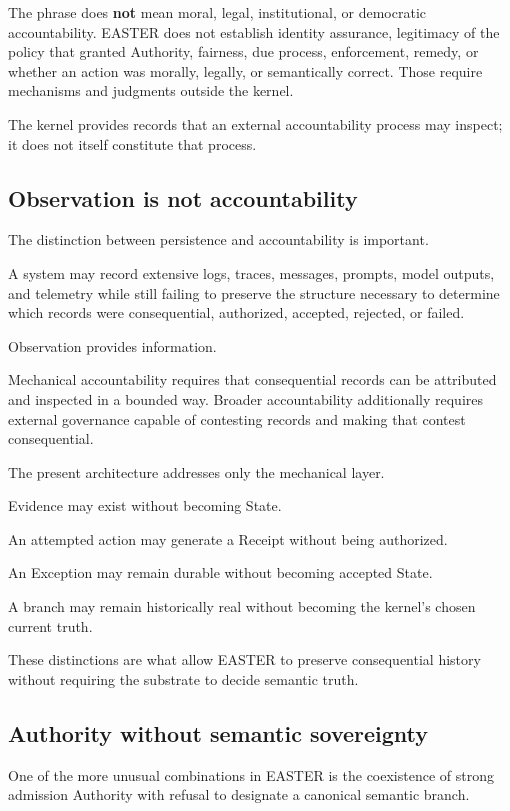 \documentclass[11pt]{article}
\begin{document}
The phrase does \textbf{not} mean moral, legal, institutional, or democratic accountability. EASTER does not establish identity assurance, legitimacy of the policy that granted Authority, fairness, due process, enforcement, remedy, or whether an action was morally, legally, or semantically correct. Those require mechanisms and judgments outside the kernel.

The kernel provides records that an external accountability process may inspect; it does not itself constitute that process.

\subsection{Observation is not accountability}

The distinction between persistence and accountability is important.

A system may record extensive logs, traces, messages, prompts, model outputs, and telemetry while still failing to preserve the structure necessary to determine which records were consequential, authorized, accepted, rejected, or failed.

Observation provides information.

Mechanical accountability requires that consequential records can be attributed and inspected in a bounded way. Broader accountability additionally requires external governance capable of contesting records and making that contest consequential.

The present architecture addresses only the mechanical layer.

Evidence may exist without becoming State.

An attempted action may generate a Receipt without being authorized.

An Exception may remain durable without becoming accepted State.

A branch may remain historically real without becoming the kernel's chosen current truth.

These distinctions are what allow EASTER to preserve consequential history without requiring the substrate to decide semantic truth.

\subsection{Authority without semantic sovereignty}

One of the more unusual combinations in EASTER is the coexistence of strong admission Authority with refusal to designate a canonical semantic branch.
\end{document}
